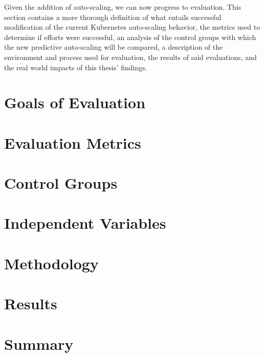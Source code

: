 Given the addition of auto-scaling, we can now progress to
evaluation. This section contains a more thorough definition of what entails
successful modification of the current Kubernetes auto-scaling behavior, the metrics
used to determine if efforts were successful, an analysis of the control groups
with which the new predictive auto-scaling will be compared, a description of
the environment and process used for evaluation, the results of said
evaluations, and the real world impacts of this thesis' findings.

\section{Goals of Evaluation}



\section{Evaluation Metrics}



\section{Control Groups}



\section{Independent Variables}



\section{Methodology}



\section{Results}
\label{evaluation-results}



\section{Summary}



